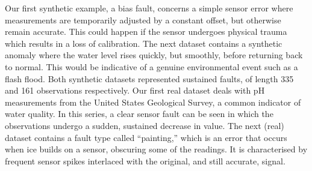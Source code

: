 \documentclass[twoside]{article}
\begin{document}
Our first synthetic example, a bias fault, concerns a simple sensor
error where measurements are temporarily adjusted by a constant
offset, but otherwise remain accurate. This could happen if the sensor
undergoes physical trauma which results in a loss of calibration.
The next dataset contains a synthetic anomaly where the water level
rises quickly, but smoothly, before returning back to normal. This
would be indicative of a genuine environmental event such as a flash
flood. Both synthetic datasets represented sustained faults, of length 335 and 161 observations respectively.
Our first real dataset deals with pH measurements from the United States Geological Survey, a common indicator of water quality. In this series, a clear sensor fault can be seen
in which the observations undergo a sudden, sustained decrease in value.
The next (real) dataset contains a fault type called ``painting,'' which is
an error that occurs when ice builds on a sensor, obscuring some of the
readings. It is characterised by frequent sensor spikes interlaced
with the original, and still accurate, signal.

\end{document}
